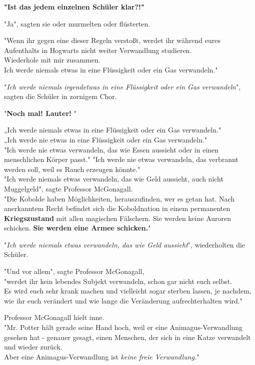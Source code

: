 {\textbf{"Ist das jedem einzelnen Schüler klar?!"}

"Ja", sagten sie oder murmelten oder flüsterten.

"Wenn ihr gegen eine dieser Regeln verstoßt, werdet ihr während eures Aufenthalts in Hogwarts nicht weiter Verwandlung studieren.\\ Wiederhole mit mir zusammen.\\ Ich werde niemals etwas in eine Flüssigkeit oder ein Gas verwandeln."

"\emph{Ich werde niemals irgendetwas in eine Flüssigkeit oder ein Gas verwandeln}", sagten die Schüler in zornigem Chor.

"\textbf{Noch mal! Lauter!} "

„Ich werde niemals etwas in eine Flüssigkeit oder ein Gas verwandeln."\\ „Ich werde nie etwas in eine Flüssigkeit oder ein Gas verwandeln."\\ "Ich werde nie etwas verwandeln, das wie Essen aussieht oder in einen menschlichen Körper passt." "Ich werde nie etwas verwandeln, das verbrannt werden soll, weil es Rauch erzeugen könnte."\\ "Ich werde niemals etwas verwandeln, das wie Geld aussieht, auch nicht Muggelgeld", sagte Professor McGonagall.\\ "Die Kobolde haben Möglichkeiten, herauszufinden, wer es getan hat. Nach anerkanntem Recht befindet sich die Koboldnation in einem permanenten \textbf{Kriegszustand} mit allen magischen Fälschern. Sie werden keine Auroren schicken. \textbf{Sie werden eine Armee schicken.}"

"\emph{Ich werde niemals etwas verwandeln, das wie Geld aussieht}", wiederholten die Schüler.

"Und vor allem", sagte Professor McGonagall,\\ "werdet ihr kein lebendes Subjekt verwandeln, schon gar nicht euch selbst.\\ Es wird euch sehr krank machen und vielleicht sogar sterben lassen, je nachdem, wie ihr euch verändert und wie lange die Veränderung aufrechterhalten wird."

Professor McGonagall hielt inne.\\ "Mr. Potter hält gerade seine Hand hoch, weil er eine Animagus-Verwandlung gesehen hat - genauer gesagt, einen Menschen, der sich in eine Katze verwandelt und wieder zurück.\\ Aber eine Animagus-Verwandlung ist \emph{keine freie Verwandlung.}"

}
